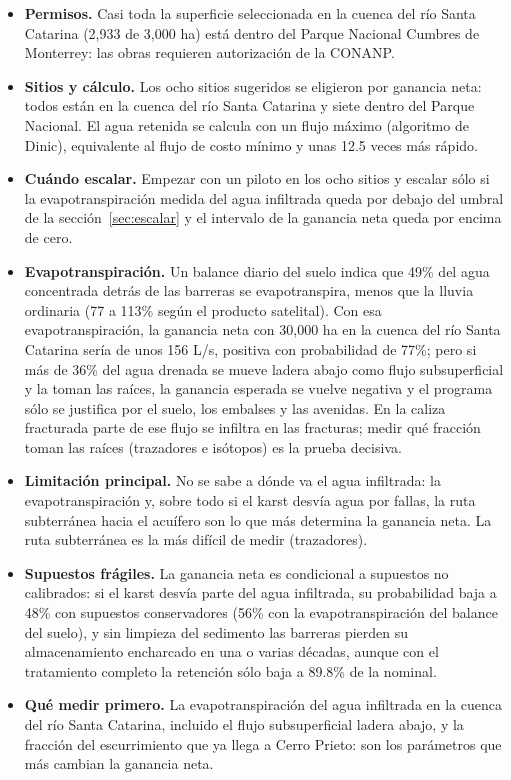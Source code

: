 \documentclass[11pt,letterpaper]{article}
\begin{document}
\begin{itemize}
  \item \textbf{Permisos.} Casi toda la superficie seleccionada en la cuenca del río Santa Catarina (2,933 de 3,000 ha) está dentro del Parque Nacional Cumbres de Monterrey: las obras requieren autorización de la CONANP.
  \item \textbf{Sitios y cálculo.} Los ocho sitios sugeridos se eligieron por ganancia neta: todos están en la cuenca del río Santa Catarina y siete dentro del Parque Nacional. El agua retenida se calcula con un flujo máximo (algoritmo de Dinic), equivalente al flujo de costo mínimo y unas 12.5 veces más rápido.
  \item \textbf{Cuándo escalar.} Empezar con un piloto en los ocho sitios y escalar sólo si la evapotranspiración medida del agua infiltrada queda por debajo del umbral de la sección~\ref{sec:escalar} y el intervalo de la ganancia neta queda por encima de cero.
  \item \textbf{Evapotranspiración.} Un balance diario del suelo indica que 49\% del agua concentrada detrás de las barreras se evapotranspira, menos que la lluvia ordinaria (77 a 113\% según el producto satelital). Con esa evapotranspiración, la ganancia neta con 30,000 ha en la cuenca del río Santa Catarina sería de unos 156 L/s, positiva con probabilidad de 77\%; pero si más de 36\% del agua drenada se mueve ladera abajo como flujo subsuperficial y la toman las raíces, la ganancia esperada se vuelve negativa y el programa sólo se justifica por el suelo, los embalses y las avenidas. En la caliza fracturada parte de ese flujo se infiltra en las fracturas; medir qué fracción toman las raíces (trazadores e isótopos) es la prueba decisiva.
  \item \textbf{Limitación principal.} No se sabe a dónde va el agua infiltrada: la evapotranspiración y, sobre todo si el karst desvía agua por fallas, la ruta subterránea hacia el acuífero son lo que más determina la ganancia neta. La ruta subterránea es la más difícil de medir (trazadores).
  \item \textbf{Supuestos frágiles.} La ganancia neta es condicional a supuestos no calibrados: si el karst desvía parte del agua infiltrada, su probabilidad baja a 48\% con supuestos conservadores (56\% con la evapotranspiración del balance del suelo), y sin limpieza del sedimento las barreras pierden su almacenamiento encharcado en una o varias décadas, aunque con el tratamiento completo la retención sólo baja a 89.8\% de la nominal.
  \item \textbf{Qué medir primero.} La evapotranspiración del agua infiltrada en la cuenca del río Santa Catarina, incluido el flujo subsuperficial ladera abajo, y la fracción del escurrimiento que ya llega a Cerro Prieto: son los parámetros que más cambian la ganancia neta.
\end{itemize}
\end{document}
